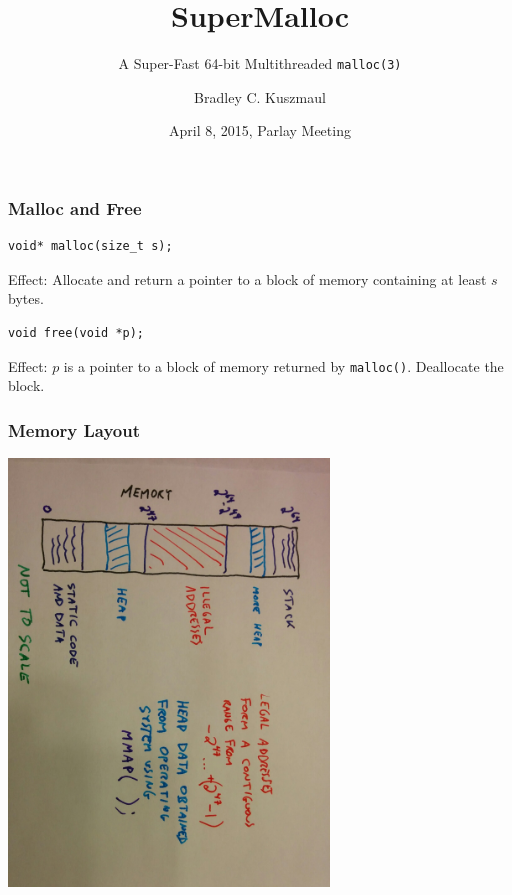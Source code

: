 \documentclass[xcolor=dvipsnames,14pt]{beamer}
\begin{document}
\title{SuperMalloc}
\subtitle{A Super-Fast 64-bit Multithreaded \texttt{malloc(3)}}
\author{Bradley C. Kuszmaul}
\date{April 8, 2015, Parlay Meeting}
\frame{\titlepage}
\begin{frame}[fragile]
\frametitle{Malloc and Free}
\begin{verbatim}
void* malloc(size_t s);
\end{verbatim}

Effect: Allocate and return a pointer to a block of memory containing at least $s$ bytes.

\begin{verbatim}
void free(void *p);
\end{verbatim}

Effect: $p$ is a pointer to a block of memory returned by \texttt{malloc()}.  Deallocate the block.
\end{frame}


\begin{frame}
\frametitle{Memory Layout}
\hspace*{-.3cm}\includegraphics[width=3.35in,angle=90]{memory-layout.jpg}
\end{frame}
\end{document}
